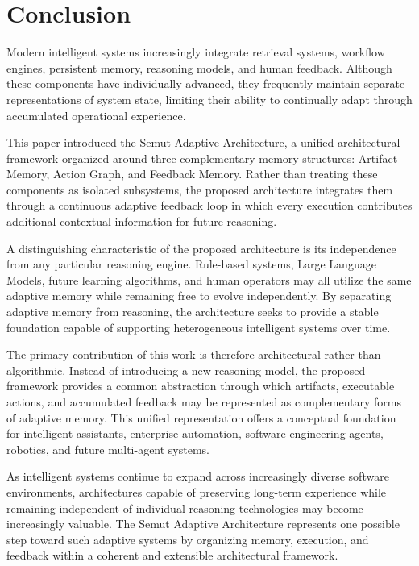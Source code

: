\section{Conclusion}
\label{sec:conclusion}

Modern intelligent systems increasingly integrate retrieval systems, workflow engines, persistent memory, reasoning models, and human feedback. Although these components have individually advanced, they frequently maintain separate representations of system state, limiting their ability to continually adapt through accumulated operational experience.

This paper introduced the Semut Adaptive Architecture, a unified architectural framework organized around three complementary memory structures: Artifact Memory, Action Graph, and Feedback Memory. Rather than treating these components as isolated subsystems, the proposed architecture integrates them through a continuous adaptive feedback loop in which every execution contributes additional contextual information for future reasoning.

A distinguishing characteristic of the proposed architecture is its independence from any particular reasoning engine. Rule-based systems, Large Language Models, future learning algorithms, and human operators may all utilize the same adaptive memory while remaining free to evolve independently. By separating adaptive memory from reasoning, the architecture seeks to provide a stable foundation capable of supporting heterogeneous intelligent systems over time.

The primary contribution of this work is therefore architectural rather than algorithmic. Instead of introducing a new reasoning model, the proposed framework provides a common abstraction through which artifacts, executable actions, and accumulated feedback may be represented as complementary forms of adaptive memory. This unified representation offers a conceptual foundation for intelligent assistants, enterprise automation, software engineering agents, robotics, and future multi-agent systems.

As intelligent systems continue to expand across increasingly diverse software environments, architectures capable of preserving long-term experience while remaining independent of individual reasoning technologies may become increasingly valuable. The Semut Adaptive Architecture represents one possible step toward such adaptive systems by organizing memory, execution, and feedback within a coherent and extensible architectural framework.

